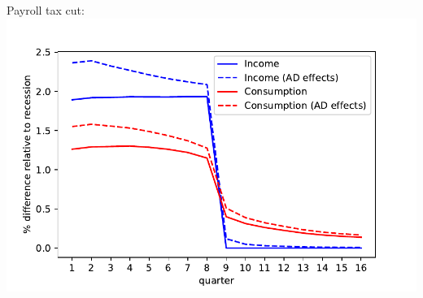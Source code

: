 \documentclass[pdflatex,aspectratio=169]{beamer}
\begin{document}
{\begin{frame}
\begin{columns}
		\begin{column}{0.33\textwidth}  
			\footnotesize Payroll tax cut:	
			\includegraphics[width=1.2\linewidth]{Code/HA-Models/FromPandemicCode/Figures/recession_taxcut_relrecession}
		\end{column}
	\end{columns}

\end{frame}
}{}
\end{document}
